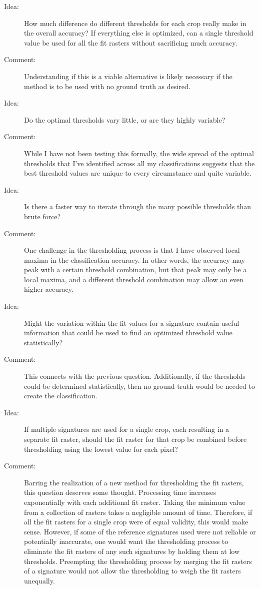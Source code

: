 \begin{description}
\item[Idea:] How much difference do different thresholds for each crop really make in the overall accuracy? If everything else is optimized, can a single threshold value be used for all the fit rasters without sacrificing much accuracy.

\item[Comment:] Understanding if this is a viable alternative is likely necessary if the method is to be used with no ground truth as desired.

\item[Idea:] Do the optimal thresholds vary little, or are they highly variable?

\item[Comment:] While I have not been testing this formally, the wide spread of the optimal thresholds that I’ve identified across all my classifications suggests that the best threshold values are unique to every circumstance and quite variable.

\item[Idea:] Is there a faster way to iterate through the many possible thresholds than brute force?

\item[Comment:] One challenge in the thresholding process is that I have observed local maxima in the classification accuracy. In other words, the accuracy may peak with a certain threshold combination, but that peak may only be a local maxima, and a different threshold combination may allow an even higher accuracy.

\item[Idea:] Might the variation within the fit values for a signature contain useful information that could be used to find an optimized threshold value statistically?

\item[Comment:] This connects with the previous question. Additionally, if the thresholds could be determined statistically, then no ground truth would be needed to create the classification.

\item[Idea:] If multiple signatures are used for a single crop, each resulting in a separate fit raster, should the fit raster for that crop be combined before thresholding using the lowest value for each pixel?

\item[Comment:] Barring the realization of a new method for thresholding the fit rasters, this question deserves some thought. Processing time increases exponentially with each additional fit raster. Taking the minimum value from a collection of rasters takes a negligible amount of time. Therefore, if all the fit rasters for a single crop were of equal validity, this would make sense. However, if some of the reference signatures used were not reliable or potentially inaccurate, one would want the thresholding process to eliminate the fit rasters of any such signatures by holding them at low thresholds. Preempting the thresholding process by merging the fit rasters of a signature would not allow the thresholding to weigh the fit rasters unequally.


\end{description}

